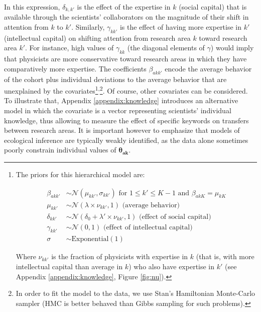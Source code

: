 \documentclass{article}
\begin{document}
In this expression, $\delta_{k,k'}$ is the effect of the expertise in $k$ (social capital) that is available through the scientists' collaborators on the magnitude of their shift in attention from $k$ to $k'$. Similarly, $\gamma_{kk'}$ is the effect of having more expertise in $k'$ (intellectual capital) on shifting attention from research area $k$ toward research area $k'$. For instance, high values of $\gamma_{kk}$ (the diagonal elements of $\gamma$) would imply that physicists are more conservative toward research areas in which they have comparatively more expertise. The coefficients $\beta_{akk'}$ encode the average behavior of the cohort plus individual deviations to the average behavior that are unexplained by the covariates\footnote{The priors for this hierarchical model are:

\begin{align}
    \beta_{akk'} &\sim \mathcal{N}(\mu_{k k'},\sigma_{k k'}) \text{ for } 1\leq k' \leq K-1 \text{ and } \beta_{ak K} = \mu_{kK}\\
    \mu_{k k'} &\sim \mathcal{N}(\lambda \times  \nu_{kk'},1) \text{ (average behavior)}\\
    \delta_{kk'} &\sim \mathcal{N}(\delta_0+\lambda ' \times \nu_{kk'},1) \text { (effect of social capital)}\\
    \gamma_{kk'} &\sim \mathcal{N}(0,1)  \text { (effect of intellectual capital)}\\
    \sigma &\sim \mathrm{Exponential}(1)
\end{align}

Where $\nu_{kk'}$ is the fraction of physicists with expertise in $k$ (that is, with more intellectual capital than average in $k$) who also have expertise in $k'$ (see Appendix \ref{appendix:knowledge}, Figure \ref{fig:nu}). 
}\textsuperscript{,}\footnote{In order to fit the model to the data, we use Stan's Hamiltonian Monte-Carlo sampler (HMC is better behaved than Gibbs sampling for such problems).%
}. Of course, other covariates can be considered. To illustrate that, Appendix \ref{appendix:knowledge} 
 introduces an alternative model in which the covariate is a vector representing scientists' individual knowledge, thus allowing to measure the effect of specific keywords on transfers between research areas. It is important however to emphasize that models of ecological inference are typically weakly identified, as the data alone sometimes poorly constrain individual values of $\bm{\theta_{ak}}$.  %
\end{document}
